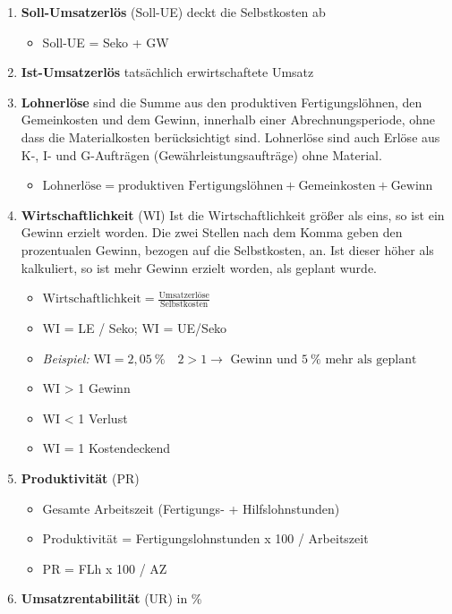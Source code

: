 \begin{enumerate}
\item
  \textbf{Soll-Umsatzerlös} (Soll-UE) deckt die Selbstkosten ab

  \begin{itemize}
  \item
    Soll-UE = Seko + GW
  \end{itemize}
\item
  \textbf{Ist-Umsatzerlös} tatsächlich erwirtschaftete Umsatz
\item
  \textbf{Lohnerlöse} sind die Summe aus den produktiven
  Fertigungslöhnen, den Gemeinkosten und dem Gewinn, innerhalb einer
  Abrechnungsperiode, ohne dass die Materialkosten berücksichtigt sind.
  Lohnerlöse sind auch Erlöse aus K-, I- und G-Aufträgen
  (Gewährleistungsaufträge) ohne Material.

  \begin{itemize}
  \item
    $\boxed{\text{Lohnerlöse} = \text{produktiven Fertigungslöhnen} + \text{Gemeinkosten} + \text{Gewinn}}$
  \end{itemize}
\item
  \textbf{Wirtschaftlichkeit} (WI) Ist die Wirtschaftlichkeit größer als
  eins, so ist ein Gewinn erzielt worden. Die zwei Stellen nach dem
  Komma geben den prozentualen Gewinn, bezogen auf die Selbstkosten, an.
  Ist dieser höher als kalkuliert, so ist mehr Gewinn erzielt worden,
  als geplant wurde.

  \begin{itemize}
  \item
    $\boxed{\text{Wirtschaftlichkeit} = \frac{\text{Umsatzerlöse}}{\text{Selbstkosten}}}$
  \item
    WI = LE / Seko; WI = UE/Seko\\
  \item
    \emph{Beispiel:}
    $\text{WI} = 2,05~\% \quad 2 > 1 \to \text{ Gewinn und } 5~\% \text{ mehr als geplant}$
  \item
    WI > 1 Gewinn
  \item
    WI \textless{} 1 Verlust
  \item
    WI = 1 Kostendeckend
  \end{itemize}
\item
  \textbf{Produktivität} (PR)

  \begin{itemize}
  \item
    Gesamte Arbeitszeit (Fertigungs- + Hilfslohnstunden)
  \item
    Produktivität = Fertigungslohnstunden x 100 / Arbeitszeit
  \item
    PR = FLh x 100 / AZ
  \end{itemize}
\item
  \textbf{Umsatzrentabilität} (UR) in \%


\end{enumerate}
